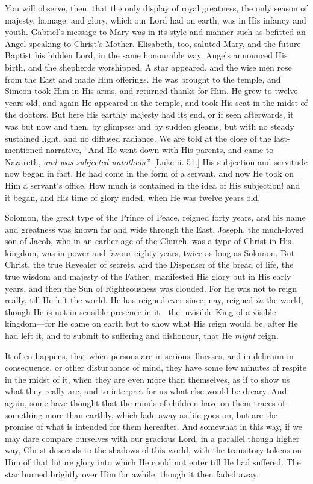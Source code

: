 You will observe, then, that the only display of royal greatness,
the only season of majesty, homage, and glory, which our Lord had on
earth, was in His infancy and youth. Gabriel's message to Mary was in
its style and manner such as befitted an Angel speaking to Christ's
Mother. Elisabeth, too, saluted Mary, and the future Baptist his
hidden Lord, in the same honourable way. Angels announced His birth,
and the shepherds worshipped. A star appeared, and the wise men rose
from the East and made Him offerings. He was brought to the temple,
and Simeon took Him in His arms, and returned thanks for Him. He grew
to twelve years old, and again He appeared in the temple, and took His
seat in the midst of the doctors. But here His earthly majesty had its
end, or if seen afterwards, it was but now and then, by glimpses and
by sudden gleams, but with no steady sustained light, and no diffused
radiance. We are told at the close of the last-mentioned narrative,
``And He went down with His parents, and came to Nazareth, \emph{and
was subjected unto}\emph{them}.'' [Luke ii. 51.] His subjection and
servitude now began in fact. He had come in the form of a servant, and
now He took on Him a servant's office. How much is contained in the
idea of His subjection! and it began, and His time of glory ended,
when He was twelve years old.

Solomon, the great type of the Prince of Peace, reigned forty
years, and his name and greatness was known far and wide through the
East. Joseph, the much-loved son of Jacob, who in an earlier age of
the Church, was a type of Christ in His kingdom, was in power and
favour eighty years, twice as long as Solomon. But Christ, the true
Revealer of secrets, and the Dispenser of the bread of life, the true
wisdom and majesty of the Father, manifested His glory but in His
early years, and then the Sun of Righteousness was clouded. For He was
not to reign really, till He left the world. He has reigned ever
since; nay, reigned \emph{in} the world, though He is not in sensible
presence in it—the invisible King of a visible kingdom—for He came
on earth but to show what His reign would be, after He had left it,
and to submit to suffering and dishonour, that He \emph{might} reign.

It often happens, that when persons are in serious illnesses, and
in delirium in consequence, or other disturbance of mind, they have
some few minutes of respite in the midst of it, when they are even
more than themselves, as if to show us what they really are, and to
interpret for us what else would be dreary. And again, some have
thought that the minds of children have on them traces of something
more than earthly, which fade away as life goes on, but are the
promise of what is intended for them hereafter. And somewhat in this
way, if we may dare compare ourselves with our gracious Lord, in a
parallel though higher way, Christ descends to the shadows of this
world, with the transitory tokens on Him of that future glory into
which He could not enter till He had suffered. The star burned
brightly over Him for awhile, though it then faded away.

